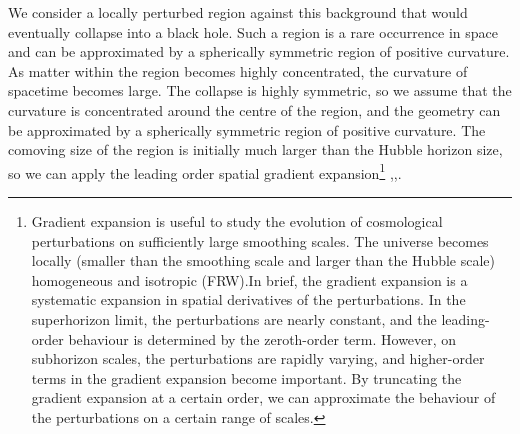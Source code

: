 \hspace{0.5cm}We consider a locally perturbed region against this background that would eventually collapse into a black hole. Such a region is a rare occurrence in space and can be approximated by a spherically symmetric region of positive curvature. As matter within the region becomes highly concentrated, the curvature of spacetime becomes large. The collapse is highly symmetric, so we assume that the curvature is concentrated around the centre of the region, and the geometry can be approximated by a spherically symmetric region of positive curvature.
 The comoving size of the region is initially much larger than the Hubble horizon size, so we can apply the leading order spatial gradient expansion\footnote{ Gradient expansion is useful to study the evolution of cosmological perturbations on sufficiently large smoothing scales. The universe becomes locally (smaller than the smoothing scale and larger than the Hubble scale) homogeneous and isotropic (FRW).In brief, the gradient expansion is a systematic expansion in spatial derivatives of the perturbations. In the superhorizon limit, the perturbations are nearly constant, and the leading-order behaviour is determined by the zeroth-order term. However, on subhorizon scales, the perturbations are rapidly varying, and higher-order terms in the gradient expansion become important. By truncating the gradient expansion at a certain order, we can approximate the behaviour of the perturbations on a certain range of scales.} \cite{Lyth_2005},\cite{Shibata_1999},\cite{Harada_2015}.\\
 
